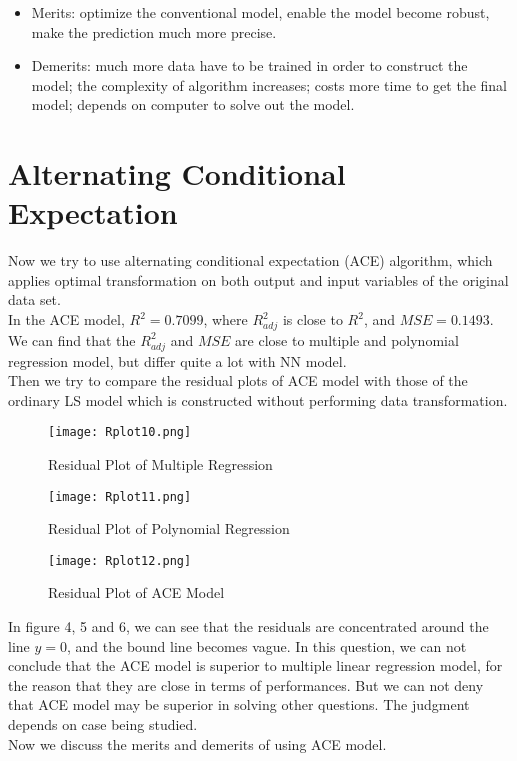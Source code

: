 \documentclass[12pt,a4paper]{article}
\begin{document}
\begin{itemize}
	\item Merits: optimize the conventional model, enable the model become robust, make the prediction much more precise.
	\item Demerits: much more data have to be trained in order to construct the model; the complexity of algorithm increases; costs more time to get the final model; depends on computer to solve out the model.
\end{itemize}

\section{Alternating Conditional Expectation}
\qquad Now we try to use alternating conditional expectation (ACE) algorithm, which applies optimal transformation on both output and input variables of the original data set.\\
\indent In the ACE model, $R^{2}=0.7099$, where $R^{2}_{adj}$ is close to $R^{2}$, and $MSE=0.1493$. We can find that the $R^{2}_{adj}$ and $MSE$ are close to multiple and polynomial regression model, but differ quite a lot with NN model.\\
\indent Then we try to compare the residual plots of ACE model with those of the ordinary LS model which is constructed without performing data transformation.

\begin{figure}[h]
	\centering
	\begin{minipage}[h]{0.48\textwidth}
		\centering
		\texttt{[image: Rplot10.png]}
		\caption{Residual Plot of Multiple Regression}
	\end{minipage}
	\begin{minipage}[h]{0.48\textwidth}
		\centering
		\texttt{[image: Rplot11.png]}
		\caption{Residual Plot of Polynomial Regression}
	\end{minipage}                
\end{figure}
\begin{figure}[h]
	\centering
	\texttt{[image: Rplot12.png]}
	\caption{Residual Plot of ACE Model}
\end{figure}
\indent In figure 4, 5 and 6, we can see that the residuals are concentrated around the line $y=0$, and the bound line becomes vague. In this question, we can not conclude that the ACE model is superior to multiple linear regression model, for the reason that they are close in terms of performances. But we can not deny that ACE model may be superior in solving other questions. The judgment depends on case being studied. \\ 
\indent Now we discuss the merits and demerits of using ACE model.
\end{document}

